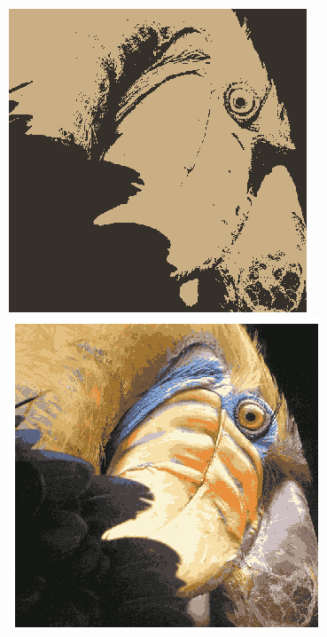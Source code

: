 \documentclass[a4paper,parskip=full-]{article}
\begin{document}
\begin{minipage}{\textwidth}
	\includegraphics[scale=0.5]{vogel2farben.png}
	\includegraphics[scale=0.5]{vogel16farben.png}
\end{minipage}
\end{document}
